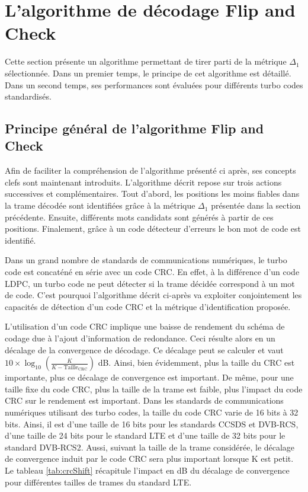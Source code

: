 \section{L'algorithme de décodage Flip and Check}
Cette section présente un algorithme permettant de tirer parti de la métrique $\Delta_1$ sélectionnée.
Dans un premier temps, le principe de cet algorithme est détaillé. Dans un second temps, ses performances sont évaluées 
pour différents turbo codes standardisés.


\subsection{Principe général de l'algorithme Flip and Check}
Afin de faciliter la compréhension de l'algorithme présenté ci après, ses concepts clefs sont maintenant introduits.
L'algorithme décrit repose sur trois actions successives et complémentaires. Tout d'abord, les positions les moins fiables dans la trame 
décodée sont identifiées grâce à la métrique $\Delta_1$ présentée dans la section précédente. Ensuite, différents mots candidats sont générés
à partir de ces positions. Finalement, grâce à un code détecteur d'erreurs le bon mot de code est identifié.

Dans un grand nombre de standards de communications numériques, le turbo code est concaténé en série avec un code CRC. En 
effet, à la différence d'un code LDPC, un turbo code ne peut détecter si la trame décidée correspond à un mot de code. 
C'est pourquoi l'algorithme  décrit ci-après va exploiter conjointement les capacités de détection d'un code CRC et la métrique 
d'identification proposée.

L'utilisation d'un code CRC implique une baisse de rendement du schéma de codage due à l'ajout d'information de redondance. Ceci résulte alors 
en un décalage de la convergence de décodage. Ce décalage peut se calculer et vaut $10\times \log_{10}\left(\frac{K}{K-\text{Taille}_\text{CRC}}\right)$ dB.
Ainsi, bien évidemment, plus la taille du CRC est importante, plus ce décalage de convergence est important. De même,
pour une taille fixe du code CRC, plus la taille de la trame est faible, plus l'impact du code CRC sur le rendement est 
important. Dans les 
standards de communications numériques utilisant des turbo codes, la taille du code CRC varie de 16 bits à 32 bits.
Ainsi, il est d'une taille de 16 bits pour les standards CCSDS et DVB-RCS, d'une taille de 24 bits pour le standard LTE et d'une taille
de 32 bits pour le standard DVB-RCS2. Aussi, suivant la taille de la trame considérée, le décalage de convergence induit par le code 
CRC sera plus important lorsque K est petit. Le tableau \ref{tab:crcShift} récapitule l'impact en dB du décalage de convergence
pour différentes tailles de trames du standard LTE. 


